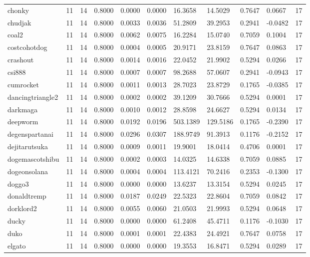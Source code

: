 \begin{table}[htbp]
\begin{tabular}{lllllllllll}
chonky & 11 & 14 & 0.8000 & 0.0000 & 0.0000 & 16.3658 & 14.5029 & 0.7647 & 0.0667 & 17 \\
chudjak & 11 & 14 & 0.8000 & 0.0033 & 0.0036 & 51.2809 & 39.2953 & 0.2941 & -0.0482 & 17 \\
coal2 & 11 & 14 & 0.8000 & 0.0062 & 0.0075 & 16.2284 & 15.0740 & 0.7059 & 0.1004 & 17 \\
costcohotdog & 11 & 14 & 0.8000 & 0.0004 & 0.0005 & 20.9171 & 23.8159 & 0.7647 & 0.0863 & 17 \\
crashout & 11 & 14 & 0.8000 & 0.0014 & 0.0016 & 22.0452 & 21.9902 & 0.5294 & 0.0266 & 17 \\
csi888 & 11 & 14 & 0.8000 & 0.0007 & 0.0007 & 98.2688 & 57.0607 & 0.2941 & -0.0943 & 17 \\
cumrocket & 11 & 14 & 0.8000 & 0.0011 & 0.0013 & 28.7023 & 23.8729 & 0.1765 & -0.0385 & 17 \\
dancingtriangle2 & 11 & 14 & 0.8000 & 0.0002 & 0.0002 & 39.1209 & 30.7666 & 0.5294 & 0.0001 & 17 \\
darkmaga & 11 & 14 & 0.8000 & 0.0010 & 0.0012 & 28.8598 & 24.6627 & 0.5294 & 0.0134 & 17 \\
deepworm & 11 & 14 & 0.8000 & 0.0192 & 0.0196 & 503.1389 & 129.5186 & 0.1765 & -0.2390 & 17 \\
degenspartanai & 11 & 14 & 0.8000 & 0.0296 & 0.0307 & 188.9749 & 91.3913 & 0.1176 & -0.2152 & 17 \\
dejitarutsuka & 11 & 14 & 0.8000 & 0.0009 & 0.0011 & 19.9001 & 18.0414 & 0.4706 & 0.0001 & 17 \\
dogemascotshibu & 11 & 14 & 0.8000 & 0.0002 & 0.0003 & 14.0325 & 14.6338 & 0.7059 & 0.0885 & 17 \\
dogeonsolana & 11 & 14 & 0.8000 & 0.0004 & 0.0004 & 113.4121 & 70.2416 & 0.2353 & -0.1300 & 17 \\
doggo3 & 11 & 14 & 0.8000 & 0.0000 & 0.0000 & 13.6237 & 13.3154 & 0.5294 & 0.0245 & 17 \\
donaldtremp & 11 & 14 & 0.8000 & 0.0187 & 0.0249 & 22.5323 & 22.8604 & 0.7059 & 0.0842 & 17 \\
dorklord2 & 11 & 14 & 0.8000 & 0.0055 & 0.0060 & 21.0503 & 21.9993 & 0.5294 & 0.0648 & 17 \\
ducky & 11 & 14 & 0.8000 & 0.0000 & 0.0000 & 61.2408 & 45.4711 & 0.1176 & -0.1030 & 17 \\
duko & 11 & 14 & 0.8000 & 0.0001 & 0.0001 & 22.4383 & 24.4921 & 0.7647 & 0.0758 & 17 \\
elgato & 11 & 14 & 0.8000 & 0.0000 & 0.0000 & 19.3553 & 16.8471 & 0.5294 & 0.0289 & 17 \\

\end{tabular}
\end{table}
